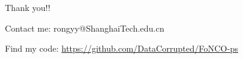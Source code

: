 \documentclass[8pt]{beamer}
\begin{document}
	\begin{frame}[c]{ }
		\centerline{\red Thank you!!}
		\vspace{3em}
		\centerline{\red  Contact me: rongyy@ShanghaiTech.edu.cn}
		\vspace{3em}
		\centerline{\red Find my code: \underline  {  https://github.com/DataCorrupted/FoNCO-ps}}
	\end{frame}
\end{document}
